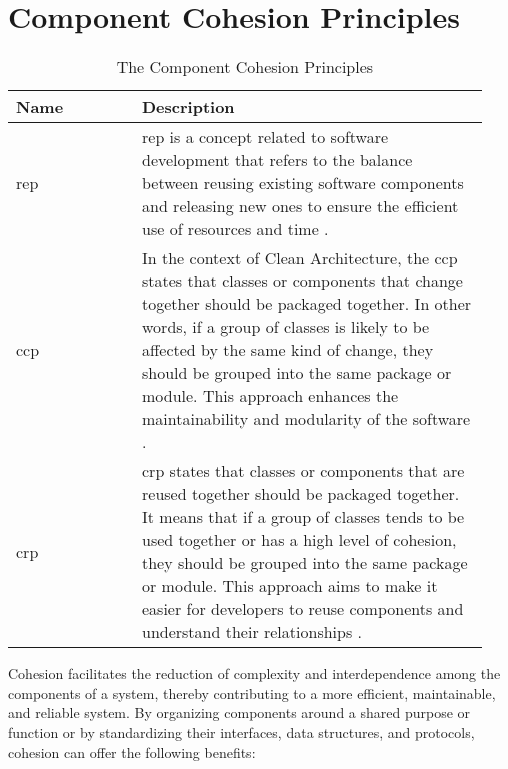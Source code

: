 \chapter{Component Cohesion Principles} \label{appendix_cohesion_principles}

\begin{table}[H]
    \small
    \begin{tabular}{ P{0.25\linewidth} | p{0.69\linewidth}} 
        \hline
        \textbf{Name} & \textbf{Description} \\ \hline
        \acrlong{rep} & \acrshort{rep} is a concept related to software development that
        refers to the balance between reusing existing software components and releasing
        new ones to ensure the efficient use of resources and time
        \parencite[104]{robert_c_martin_clean_2018}.\\ \midrule 
        
        \acrlong{ccp} & In the context of Clean Architecture, the \acrshort{ccp} states
        that classes or components that change together should be packaged together. In
        other words, if a group of classes is likely to be affected by the same kind of
        change, they should be grouped into the same package or module. This approach
        enhances the maintainability and modularity of the software
        \parencite[105]{robert_c_martin_clean_2018}.\\ \midrule 
        
        \acrlong{crp} & \acrshort{crp} states that classes or components that are reused
        together should be packaged together. It means that if a group of classes tends to
        be used together or has a high level of cohesion, they should be grouped into the
        same package or module. This approach aims to make it easier for developers to
        reuse components and understand their relationships
        \parencite[107]{robert_c_martin_clean_2018}.\\

        \bottomrule
    \end{tabular}
    \caption{The Component Cohesion Principles}
    \label{appendix_tab_cohesion_principles}
\end{table}

Cohesion facilitates the reduction of complexity and interdependence among the components
of a system, thereby contributing to a more efficient, maintainable, and reliable system.
By organizing components around a shared purpose or function or by standardizing their
interfaces, data structures, and protocols, cohesion can offer the following benefits:

